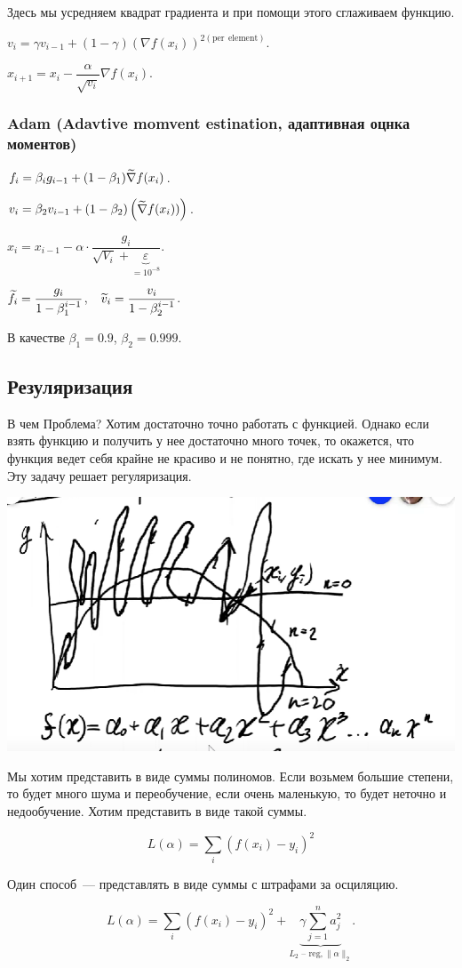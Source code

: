 Здесь мы усредняем квадрат градиента и при помощи этого сглаживаем функцию.

$v_i = \gamma v_{i - 1} + (1 -\gamma ) (\nabla f (x_i))^{2 (\mathrm{per~~element})}$.

$x_{i +1} = x_i - \dfrac{\alpha}{\sqrt{v_i}} \nabla f (x_i)$.

\subsubsection{Adam (Adavtive momvent estination, адаптивная оцнка моментов)}

$f_i = \beta_i g_{i - 1} + (1 - \beta_1) \widetilde{\nabla} f (x_i)$.

$v_i = \beta_2 v_{i-1} + (1 - \beta _2) \left(\widetilde{\nabla} f (x_i))\right)$.

$x_i = x_{i - 1} - \alpha \cdot \dfrac{g_i}{\sqrt{V_i} + \underbrace{\varepsilon}_{=10^{-8}}}$.

$\widetilde{f}_i = \dfrac{g_i}{1 - \beta_1 ^{i-1}}$,~~$ \widetilde{v}_i = \dfrac{v_i}{1 -\beta_{2}^{i-1}}$.

В качестве $\beta_1 = 0.9$, $\beta_2 = 0.999$.

\subsection{Резуляризация}

В чем Проблема? Хотим достаточно точно работать с функцией. Однако если взять функцию и получить у нее достаточно много точек, то окажется, что функция ведет себя крайне не красиво и не понятно, где искать у нее минимум. Эту задачу решает регуляризация.

\begin{center}
    \includegraphics[scale=0.55]{img/regularisation-ex1.png}
\end{center}

Мы хотим представить в виде суммы полиномов.
Если возьмем большие степени, то будет много шума и переобучение, если очень маленькую, то будет неточно и недообучение. Хотим представить в виде такой суммы.

\[ L(\alpha) = \sum_i \left(f (x_i) - y_i \right)^2 \]

Один способ~--- представлять в виде суммы с штрафами за осциляцию.

\[ L (\alpha) = \sum_i \left( f (x_i) - y_i \right)^2 + \underbrace{\gamma \sum_{j=1}^n a_j^2}_{L_2 \text{ -- reg}, \| \alpha \|_2 }.  \]
